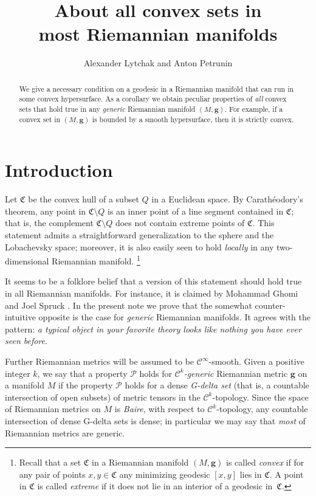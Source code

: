\documentclass[a4paper,10pt]{article}
\def\thetitle{About all convex sets in\\ most Riemannian manifolds}
\begin{document}
\title{\thetitle}
\author{Alexander Lytchak and Anton Petrunin}
\date{}
\maketitle

\begin{abstract}
We give a necessary condition on a geodesic in a Riemannian manifold that can run in some convex hypersurface.
As a corollary we obtain peculiar properties of \emph{all} convex sets that hold true in any \emph{generic} Riemannian manifold $(M,\bm{g})$.
For example, if a convex set in $(M,\bm{g})$ is bounded by a smooth hypersurface, then it is strictly convex.
\end{abstract}

\section{Introduction}
Let $\mathfrak{C}$ be the convex hull of a subset $Q$ in a Euclidean space.
By Carathéodory's theorem, any point in $\mathfrak{C}\setminus Q$ is an inner point of a line segment contained in $\mathfrak{C}$;
that is, the complement $\mathfrak{C} \setminus Q$ does not contain extreme points of $\mathfrak{C}$.
This statement admits a straightforward generalization to the sphere and the  Lobachevsky space; moreover, it  is also easily seen to hold \emph{locally} in any two-dimensional Riemannian manifold.%
\footnote{Recall that a set $\mathfrak{C}$ in a Riemannian manifold $(M,\bm{g})$ is called \emph{convex} if for any pair of points $x,y\in \mathfrak{C}$ any minimizing geodesic $[x,y]$ lies in $\mathfrak{C}$.
A point in $\mathfrak{C}$ is called \emph{extreme} if it does not lie in an interior of a geodesic in~$\mathfrak{C}$.}

It seems to be a folklore belief that a version of this statement should hold true in all Riemannian manifolds.
For instance, it is claimed by Mohammad Ghomi and Joel Spruck \cite[Lemma 9.1]{Ghomi}.
In the present note we prove that the somewhat counter-intuitive opposite is the case for \emph{generic} Riemannian manifolds.
It agrees with the pattern: \emph{a typical object in your favorite theory looks like nothing you have ever seen before}.

Further Riemannian metrics will be assumed to be $\mathcal C^\infty$-smooth.
Given a positive integer $k$, we say that a property $\mathcal P$ holds for \emph{$\mathcal C^k$-generic} Riemannian metric $\bm{g}$ on a manifold $M$ 
if the property $\mathcal P$ holds for a dense \emph{G-delta set} (that is, a countable intersection of open subsets) of metric tensors in the $\mathcal C^k$-topology.
Since the space of Riemannian metrics  on $M$ is \emph{Baire}, with  respect to $\mathcal C^k$-topology, any 
countable intersection of dense G-delta sets is dense;
in particular we may say that \emph{most} of Riemannian metrics are generic.
\end{document}
